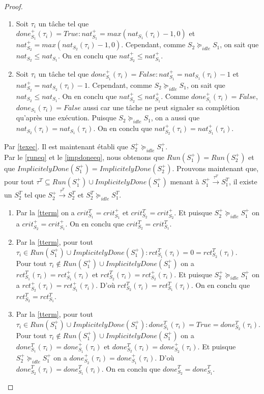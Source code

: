 \documentclass[a4paper]{report}
\theoremstyle{break}
\theoremstyle{breakplain}
\begin{document}
\begin{proof}
\begin{enumerate}
\item Soit $\tau_i$ un tâche tel que $done_{S_1}^+(\tau_i) = True : nat_{S_1}^+ = max(nat_{S_1}(\tau_i)-1, 0)$ et $nat_{S_2}^+ = max(nat_{S_2}(\tau_i)-1, 0)$. Cependant, comme $S_2 \succeq_{idle} S_1$, on sait que $nat_{S_2} \leq nat_{S_1}$. On en conclu que $nat_{S_2}^+ \leq nat_{S_1}^+$.

\item Soit $\tau_i$ un tâche tel que $done_{S_1}^+(\tau_i) = False : nat_{S_1}^+ = nat_{S_1}(\tau_i)-1$ et $nat_{S_2}^+ = nat_{S_2}(\tau_i)-1$. Cependant, comme $S_2 \succeq_{idle} S_1$, on sait que $nat_{S_2} \leq nat_{S_1}$. On en conclu que $nat_{S_2}^+ \leq nat_{S_1}^+$. Comme $done_{S_1}^+(\tau_i) = False$, $done_{S_1}(\tau_i) = False$ aussi car une tâche ne peut signaler sa complétion qu'après une exécution. Puisque $S_2 \succeq_{idle} S_1$, on a aussi que $nat_{S_2}(\tau_i) = nat_{S_1}(\tau_i)$. On en conclu que $nat_{S_2}^+(\tau_i) = nat_{S_1}^+(\tau_i)$.
\end{enumerate}
Par \autoref{texec}. Il est maintenant établi que $S^+_2 \succeq_{idle} S^+_1$.\\

Par le \autoref{runeq} et le \autoref{impdoneeq}, nous obtenons que $Run(S^+_1) = Run(S^+_2)$ et que $ImplicitelyDone(S^+_1) = ImplicitelyDone(S_2^+)$.
Prouvons maintenant que, pour tout $\tau^T\subseteq Run(S_1^+) \cup ImplicitelyDone(S_1^+)$ menant à $S_1^+ \xrightarrow{\tau^T} S_1^T$, il existe un $S_2^T$ tel que $S_2^+ \xrightarrow{\tau^T} S_2^T$ et $S_2^T \succeq_{idle} S_1^T$.
\begin{enumerate}

\item Par la \autoref{tterm} on a $crit_{S_1}^T = crit_{S_1}^+$ et $crit_{S_2}^T = crit_{S_2}^+$. Et puisque $S^+_2 \succeq_{idle} S^+_1$ on a $crit_{S_2}^+= crit_{S_1}^+$. On en conclu que $crit_{S_2}^T= crit_{S_1}^T$.

\item Par la \autoref{tterm}, pour tout $\tau_i \in Run(S_1^+) \cup ImplicitelyDone(S_1^+) : rct_{S_1}^T(\tau_i) = 0 = rct_{S_2}^T(\tau_i)$.\\ Pour tout $\tau_i \notin Run(S_1^+) \cup ImplicitelyDone(S_1^+)$ on a $rct_{S_1}^T(\tau_i) = rct_{S_1}^+(\tau_i)$ et $rct_{S_2}^T(\tau_i) = rct_{S_2}^+(\tau_i)$. Et puisque $S^+_2 \succeq_{idle} S^+_1$ on a $rct_{S_2}^+(\tau_i)= rct_{S_1}^+(\tau_i)$. D'où $rct_{S_2}^T(\tau_i) = rct_{S_1}^T(\tau_i)$. On en conclu que $rct_{S_2}^T = rct_{S_1}^T$.


\item Par la \autoref{tterm}, pour tout $\tau_i \in Run(S_1^+) \cup ImplicitelyDone(S_1^+) : done_{S_1}^T(\tau_i) = True = done_{S_2}^T(\tau_i)$.\\ Pour tout $\tau_i \notin Run(S_1^+) \cup ImplicitelyDone(S_1^+)$ on a $done_{S_1}^T(\tau_i) = done_{S_1}^+(\tau_i)$ et $done_{S_2}^T(\tau_i) = done_{S_2}^+(\tau_i)$. Et puisque $S^+_2 \succeq_{idle} S^+_1$ on a $done_{S_2}^+(\tau_i)= done_{S_1}^+(\tau_i)$. D'où $done_{S_2}^T(\tau_i) = done_{S_1}^T(\tau_i)$. On en conclu que $done_{S_2}^T = done_{S_1}^T$.



\end{enumerate}
\end{proof}
\end{document}

